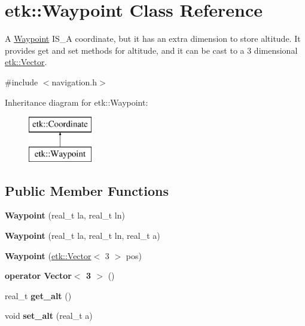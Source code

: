 \hypertarget{classetk_1_1_waypoint}{\section{etk\-:\-:Waypoint Class Reference}
\label{classetk_1_1_waypoint}
}


A \hyperlink{classetk_1_1_waypoint}{Waypoint} I\-S\-\_\-\-A coordinate, but it has an extra dimension to store altitude. It provides get and set methods for altitude, and it can be cast to a 3 dimensional \hyperlink{classetk_1_1_vector}{etk\-::\-Vector}.  




{\ttfamily \#include $<$navigation.\-h$>$}

Inheritance diagram for etk\-:\-:Waypoint\-:\begin{figure}[H]
\begin{center}
\leavevmode
\includegraphics[height=2.000000cm]{classetk_1_1_waypoint}
\end{center}
\end{figure}
\subsection*{Public Member Functions}
\begin{DoxyCompactItemize}
\item 
\hypertarget{classetk_1_1_waypoint_a5dcd644878b98b826ddc1b56e0e3c279}{{\bfseries Waypoint} (real\-\_\-t la, real\-\_\-t ln)}\label{classetk_1_1_waypoint_a5dcd644878b98b826ddc1b56e0e3c279}

\item 
\hypertarget{classetk_1_1_waypoint_a2104309ef0f478a9f58f6b4f84e189d5}{{\bfseries Waypoint} (real\-\_\-t la, real\-\_\-t ln, real\-\_\-t a)}\label{classetk_1_1_waypoint_a2104309ef0f478a9f58f6b4f84e189d5}

\item 
\hypertarget{classetk_1_1_waypoint_a153e7a17f2de1340493b3f09f3eea3b5}{{\bfseries Waypoint} (\hyperlink{classetk_1_1_vector}{etk\-::\-Vector}$<$ 3 $>$ pos)}\label{classetk_1_1_waypoint_a153e7a17f2de1340493b3f09f3eea3b5}

\item 
\hypertarget{classetk_1_1_waypoint_a713be7c1b38ef8b77bcdf976caa69aa5}{{\bfseries operator Vector$<$ 3 $>$} ()}\label{classetk_1_1_waypoint_a713be7c1b38ef8b77bcdf976caa69aa5}

\item 
\hypertarget{classetk_1_1_waypoint_a6ab344e8ab1bbc831a0b4cf97a6eff56}{real\-\_\-t {\bfseries get\-\_\-alt} ()}\label{classetk_1_1_waypoint_a6ab344e8ab1bbc831a0b4cf97a6eff56}

\item 
\hypertarget{classetk_1_1_waypoint_ad1648e2e4c9595956ce2a773636c355b}{void {\bfseries set\-\_\-alt} (real\-\_\-t a)}\label{classetk_1_1_waypoint_ad1648e2e4c9595956ce2a773636c355b}

\end{DoxyCompactItemize}
